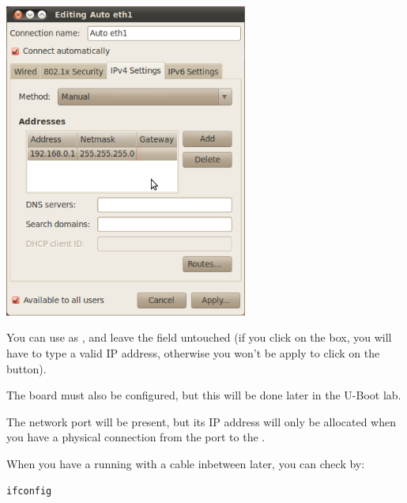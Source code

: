 \begin{center}
\includegraphics[width=8cm]{labs/setup-network/network-config-3.png}
\end{center}

You can use  as , and leave the
 field untouched (if you click on the  box, you
will have to type a valid IP address, otherwise you won't be apply to
click on the  button).

The board must also be configured, but this will be done later in the U-Boot lab.

The network port will be present, but its IP address will only be allocated when
you have a physical connection from the port to the \devboard.

When you have a running \devboard with a cable inbetween later, you can check by:

\begin{verbatim}
ifconfig
\end{verbatim}

